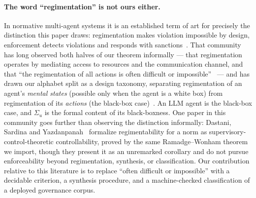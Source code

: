 \documentclass[11pt,a4paper]{article}  \usepackage{mdframed} \usepackage{graphicx} \usepackage{tabularx}
\begin{document}
\paragraph{The word ``regimentation'' is not ours either.} In normative multi-agent systems it is an established term of art
for precisely the distinction this paper draws: regimentation makes violation impossible by design, enforcement detects
violations and responds with sanctions~\cite{gad06}. That community has long observed both halves of our theorem informally
--- that regimentation operates by mediating access to resources and the communication channel, and that ``the regimentation
of all actions is often difficult or impossible''~\cite{cs16} --- and has drawn our alphabet split as a design taxonomy,
separating regimentation of an agent's \emph{mental states} (possible only when the agent is a white box) from regimentation
of its \emph{actions} (the black-box case)~\cite{balke09}. An LLM agent is the black-box case, and $\Sigma_u$ is the formal
content of its black-boxness. One paper in this community goes further than observing the distinction informally: Dastani,
Sardina and Yazdanpanah~\cite{dsy17} formalize regimentability for a norm as supervisory-control-theoretic controllability,
proved by the same Ramadge--Wonham theorem we import, though they present it as an unremarked corollary and do not pursue
enforceability beyond regimentation, synthesis, or classification. Our contribution relative to this literature is to
replace ``often difficult or impossible'' with a decidable criterion, a synthesis procedure, and a machine-checked
classification of a deployed governance corpus.
\end{document}
